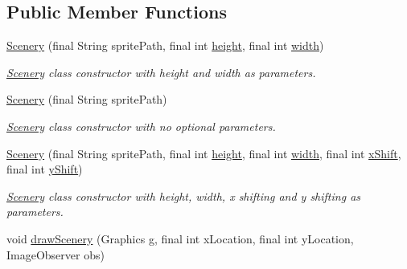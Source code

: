 \subsection*{Public Member Functions}
\begin{DoxyCompactItemize}
\item 
\hyperlink{classworld_1_1scenery_1_1_scenery_a5d81bf38557186468da4cd02418aa438}{Scenery} (final String sprite\-Path, final int \hyperlink{classworld_1_1scenery_1_1_scenery_a54b4edfa060087e78a829105bf62a900}{height}, final int \hyperlink{classworld_1_1scenery_1_1_scenery_ad10b27080954e2fc06aa1718f47c4ce1}{width})
\begin{DoxyCompactList}\small\item\em \hyperlink{classworld_1_1scenery_1_1_scenery}{Scenery} class constructor with height and width as parameters. \end{DoxyCompactList}\item 
\hyperlink{classworld_1_1scenery_1_1_scenery_ae902f14479de352e82b78b4bac6173a1}{Scenery} (final String sprite\-Path)
\begin{DoxyCompactList}\small\item\em \hyperlink{classworld_1_1scenery_1_1_scenery}{Scenery} class constructor with no optional parameters. \end{DoxyCompactList}\item 
\hyperlink{classworld_1_1scenery_1_1_scenery_acdcbdff884b9910e4afa40276751cf14}{Scenery} (final String sprite\-Path, final int \hyperlink{classworld_1_1scenery_1_1_scenery_a54b4edfa060087e78a829105bf62a900}{height}, final int \hyperlink{classworld_1_1scenery_1_1_scenery_ad10b27080954e2fc06aa1718f47c4ce1}{width}, final int \hyperlink{classworld_1_1scenery_1_1_scenery_a0999f105f7630fd67fd9d440da6983aa}{x\-Shift}, final int \hyperlink{classworld_1_1scenery_1_1_scenery_ac9ca2c17cf6920deffe490c013b0e638}{y\-Shift})
\begin{DoxyCompactList}\small\item\em \hyperlink{classworld_1_1scenery_1_1_scenery}{Scenery} class constructor with height, width, x shifting and y shifting as parameters. \end{DoxyCompactList}\item 
void \hyperlink{classworld_1_1scenery_1_1_scenery_a626c1ae7fa15d2f96d564c35368fdbc9}{draw\-Scenery} (Graphics g, final int x\-Location, final int y\-Location, Image\-Observer obs)
\end{DoxyCompactItemize}
